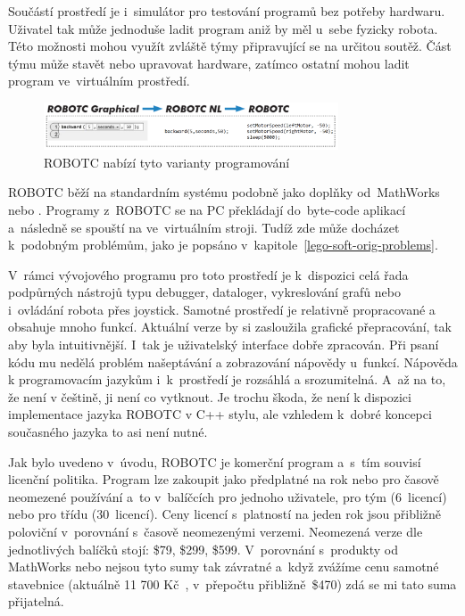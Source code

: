 Součástí prostředí je i~simulátor pro testování programů bez potřeby hardwaru. 
Uživatel tak může jednoduše ladit program aniž by měl u~sebe fyzicky robota.
Této možnosti mohou využít zvláště týmy připravující se na určitou soutěž. 
Část týmu může stavět nebo upravovat hardware, zatímco ostatní mohou ladit program ve~virtuálním prostředí. 

\begin{figure}[h]
	\centering
	\includegraphics[width=330px]{images/robotc_language-variants.png}
	\caption[ROBOTC nabízí tyto varianty programování]{ROBOTC nabízí tyto varianty programování\protect\footnotemark} %
	\label{robotc_language-variants}
\end{figure}


ROBOTC běží na standardním \lego{} systému podobně jako doplňky od~MathWorks nebo \NI{}.
Programy z~ROBOTC se na PC překládají do~byte-code aplikací a~následně se spouští na  ve~virtuálním stroji. 
Tudíž zde může docházet k~podobným problémům, jako je popsáno v~kapitole~\ref{lego-soft-orig-problems}.

V~rámci vývojového programu pro toto prostředí je k~dispozici celá řada podpůrných nástrojů typu debugger, dataloger, vykreslování grafů nebo i~ovládání robota přes joystick.
Samotné prostředí je relativně propracované a obsahuje mnoho funkcí. 
Aktuální verze by si zasloužila grafické přepracování, tak aby byla intuitivnější. 
I~tak je uživatelský interface dobře zpracován. 
Při psaní kódu mu nedělá problém našeptávání a zobrazování nápovědy u~funkcí.
Nápověda k programovacím jazykům i~k~prostředí je rozsáhlá a srozumitelná. 
A~až na to, že není v češtině, ji není co vytknout. %
Je trochu škoda, že není k dispozici implementace jazyka ROBOTC v C++ stylu, ale vzhledem k~dobré koncepci současného jazyka to asi není nutné. 

Jak bylo uvedeno v~úvodu, ROBOTC je komerční program a~s~tím souvisí licenční politika. 
Program lze zakoupit jako předplatné na rok nebo pro časově neomezené používání a~to v~balíčcích pro jednoho uživatele, pro tým (6~licencí) nebo pro třídu (30~licencí). 
Ceny licencí s~platností na jeden rok jsou přibližně poloviční v~porovnání s~časově neomezenými verzemi.
Neomezená verze dle jednotlivých balíčků stojí: \$79, \$299, \$599.  
V~porovnání s~produkty od MathWorks nebo \NI{} nejsou tyto sumy tak závratné a~když zvážíme cenu samotné stavebnice \legoEV{} (aktuálně 11 700 Kč~\cite{lego_eduxeEshop_CoreSet}, v~přepočtu přibližně~\$470) zdá se mi tato suma přijatelná.

